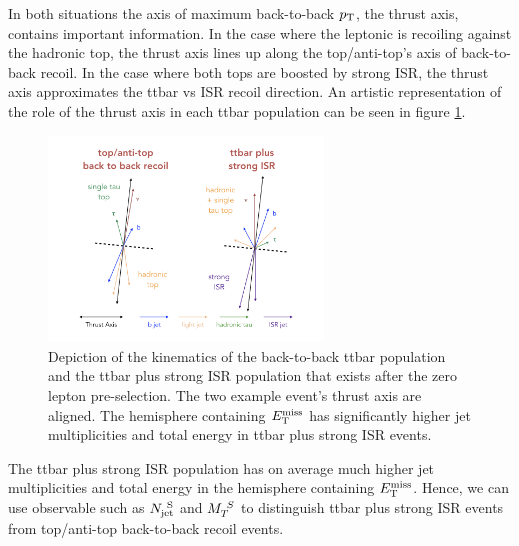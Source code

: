 \indent In both situations the axis of maximum back-to-back $p_{\mathrm{T}}$, the thrust axis, contains important information.  In the case where the leptonic is recoiling against the hadronic top, the thrust axis lines up along the top/anti-top's axis of back-to-back recoil.  In the case where both tops are boosted by strong ISR, the thrust axis approximates the ttbar vs ISR recoil direction. An artistic representation of the role of the thrust axis in each ttbar population can be seen in figure \ref{fig:ttbar:2pop}. \\

\begin{figure}[h!]
  \centering
	\includegraphics[width=0.65\textwidth]{./figures/strategy/ttbar_2pop.png}
	\caption{\label{fig:ttbar:2pop}{Depiction of the kinematics of the back-to-back ttbar population and the ttbar plus strong ISR population that exists after the zero lepton pre-selection. The two example event's thrust axis are aligned.  The hemisphere containing $E_{\mathrm{T}}^{\mathrm{miss}}$ has significantly higher jet multiplicities and total energy in ttbar plus strong ISR events. }}
\end{figure}

\indent The ttbar plus strong ISR population has on average much higher jet multiplicities and total energy in the hemisphere containing $E_{\mathrm{T}}^{\mathrm{miss}}$.  Hence, we can use observable such as $N_{\mathrm{jet}}^{~\mathrm{S}}$ and $M_{T}^{~S}$ to distinguish ttbar plus strong ISR events from top/anti-top back-to-back recoil events.   \\



